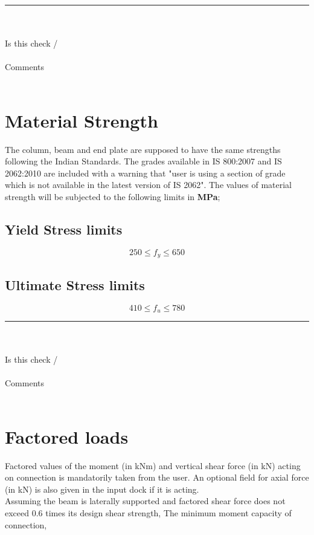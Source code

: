 \documentclass[11.5pt,a4paper,oneside]{report}
\newcommand{\okornot}{ \vspace{15mm} \hrule
	\noindent \\ \\
	Is this check \qquad
	\CheckBox[checked=False, name= ok]{\textbf{Ok}} \qquad / 
	\CheckBox[checked=False, name= notok]{\textbf{Not Ok}}\\ \\
	Comments \\ \\
	\noindent
	\TextField[name=multilinetextbox, multiline=true, width=1.0\linewidth,height=2in]{}}
\begin{document}
\begin{Form}
\okornot
\chapter{Material Strength}
%
The column, beam and end plate are supposed to have the same strengths following the Indian Standards. The grades available in IS 800:2007 and IS 2062:2010 are included with a warning that "user is using a section of grade which is not available in the latest version of IS 2062". The values of material strength will be subjected to the following limits in \textbf{MPa};
\section{Yield Stress limits}
\qquad {}
	\begin{equation}
		250 \leq f_{y} \leq 650
	\end{equation}
\section{Ultimate Stress limits}
\qquad {}
	\begin{equation}
		410 \leq f_{u} \leq 780
	\end{equation}

	\okornot
\chapter{Factored loads}
%
Factored values of the moment (in kNm) and vertical shear force  (in kN) acting on connection is mandatorily taken from the user. An optional field for axial force (in kN) is also given in the input dock if it is acting.\\
Assuming the beam is laterally supported and factored shear force does not exceed 0.6 times its design shear strength, 
The minimum moment capacity of connection,


\end{Form}
\end{document}

